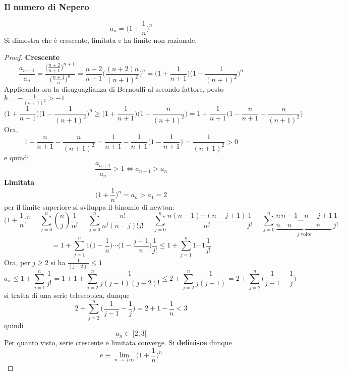 \documentclass[10pt, oneside]{book}
\theoremstyle{plain}
\begin{document}
\subsubsection*{Il numero di Nepero}
\[a_n = \bigg(1 + \frac{1}{n}\bigg)^n\]
Si dimostra che è crescente, limitata e ha limite non razionale.
\begin{proof}
\textbf{Crescente}
\[\frac{a_{n+1}}{a_n} = \frac{\big(\frac{n+2}{n+1}\big)^{n+1}}{\big(\frac{n+1}{n}\big)^n} = \frac{n+2}{n+1} \bigg(\frac{(n+2)n}{(n+1)^2}\bigg)^n = \bigg(1 + \frac{1}{n+1}\bigg) \bigg(1 - \frac{1}{(n+1)^2}\bigg)^n \]
Applicando ora la disuguaglianza di Bernoulli al secondo fattore, posto $\displaystyle h = - \frac{1}{(n+1)^2} > -1$
\[\bigg(1 + \frac{1}{n+1}\bigg) \bigg(1 - \frac{1}{(n+1)^2}\bigg)^n \geq \bigg(1 + \frac{1}{n+1}\bigg) \bigg(1 - \frac{n}{(n+1)^2}\bigg) = 1 + \frac{1}{n+1} \bigg(1 - \frac{n}{n+1} - \frac{n}{(n+1)^2}\bigg)\]
Ora,
\[1 - \frac{n}{n+1} - \frac{n}{(n+1)^2} = \frac{1}{n+1} - \frac{1}{n+1} \big(1 - \frac{1}{n+1}\big) = \frac{1}{(n+1)^2} > 0\]
e quindi 
\[\frac{a_{n+1}}{a_n} > 1 \Longleftrightarrow a_{n+1} > a_n\]
\textbf{Limitata}
\[\bigg(1 + \frac{1}{n}\bigg)^{n} = a_n > a_1 = 2\]
per il limite superiore si sviluppa il binomio di newton:
\[\bigg(1 + \frac{1}{n}\bigg)^{n} = \sum\limits_{j=0}^{n} \binom{n}{j} \frac{1}{n^j} = \sum\limits_{j=0}^{n} \frac{n!}{n^j (n-j)! j!} = \sum\limits_{j=0}^{n} \frac{n (n-1) \cdots (n-j+1)}{n^j} \frac{1}{j!} = \sum\limits_{j=0}^{n} \underbrace{\frac{n}{n} \frac{n-1}{n} \cdots \frac{n-j+1}{n}}_{j \textrm{ volte}} \frac{1}{j!} =\]
\[= 1 + \sum\limits_{j=1}^{n} 1 \big(1 - \frac{1}{n}\big) \cdots \big(1 - \frac{j-1}{n}\big) \frac{1}{j!} \leq 1 + \sum\limits_{j=1}^{n} 1 \cdots 1 \frac{1}{j!}\]
Ora, per $j \geq 2$ si ha $\displaystyle \frac{1}{(j-2)!} \leq 1$
\[a_n \leq 1 + \sum\limits_{j=1}^{n} \frac{1}{j!} = 1 + 1 + \sum\limits_{j=2}^{n} \frac{1}{j (j-1) (j-2)!} \leq 2 + \sum\limits_{j=2}^{n} \frac{1}{j (j-1)} = 2 + \sum\limits_{j=2}^{n} \bigg(\frac{1}{j-1} - \frac{1}{j}\bigg)\]
si tratta di una serie telescopica, dunque
\[2 + \sum\limits_{j=2}^{n} \bigg(\frac{1}{j-1} - \frac{1}{j}\bigg) = 2 + 1 - \frac{1}{n} < 3\]
quindi
\[a_n \in \, \big] 2,3 \big[\]
Per quanto visto, serie crescente e limitata converge. Si \textbf{definisce} dunque
\[e \equiv \lim\limits_{n \rightarrow +\infty} \bigg(1+\frac{1}{n}\bigg)^{n}\]
\end{proof}
\end{document}
